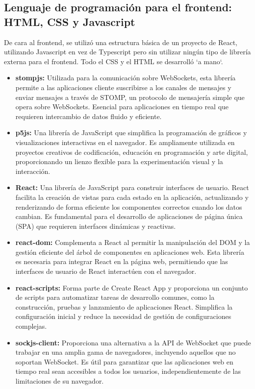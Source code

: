 \subsection{Lenguaje de programación para el frontend: HTML, CSS y Javascript}
De cara al frontend, se utilizó una estructura básica de un proyecto de React, utilizando Javascript en vez de Typescript pero sin utilizar ningún tipo de librería externa para el frontend. Todo el CSS y el HTML se desarrolló `a mano`.
\begin{itemize}
    \item \textbf{stompjs:}\cite{stompjsFrontend} Utilizada para la comunicación sobre WebSockets, esta librería permite a las aplicaciones cliente suscribirse a los canales de mensajes y enviar mensajes a través de STOMP, un protocolo de mensajería simple que opera sobre WebSockets. Esencial para aplicaciones en tiempo real que requieren intercambio de datos fluido y eficiente.
    \item \textbf{p5js:}\cite{p5js} Una librería de JavaScript que simplifica la programación de gráficos y visualizaciones interactivas en el navegador. Es ampliamente utilizada en proyectos creativos de codificación, educación en programación y arte digital, proporcionando un lienzo flexible para la experimentación visual y la interacción.
    
    \item \textbf{React:}\cite{React} Una librería de JavaScript para construir interfaces de usuario. React facilita la creación de vistas para cada estado en la aplicación, actualizando y renderizando de forma eficiente los componentes correctos cuando los datos cambian. Es fundamental para el desarrollo de aplicaciones de página única (SPA) que requieren interfaces dinámicas y reactivas.
    
    \item \textbf{react-dom:}\cite{ReactDOM} Complementa a React al permitir la manipulación del DOM y la gestión eficiente del árbol de componentes en aplicaciones web. Esta librería es necesaria para integrar React en la página web, permitiendo que las interfaces de usuario de React interactúen con el navegador.
    
    \item \textbf{react-scripts:}\cite{ReactScripts} Forma parte de Create React App y proporciona un conjunto de scripts para automatizar tareas de desarrollo comunes, como la construcción, pruebas y lanzamiento de aplicaciones React. Simplifica la configuración inicial y reduce la necesidad de gestión de configuraciones complejas.
    
    \item \textbf{sockjs-client:}\cite{SockJSClient} Proporciona una alternativa a la API de WebSocket que puede trabajar en una amplia gama de navegadores, incluyendo aquellos que no soportan WebSocket. Es útil para garantizar que las aplicaciones web en tiempo real sean accesibles a todos los usuarios, independientemente de las limitaciones de su navegador.
\end{itemize}

